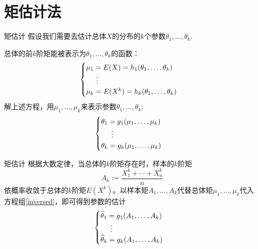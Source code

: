 
\section{矩估计法}


\begin{frame}

\begin{block}{矩估计}
假设我们需要去估计总体$X$的分布的$k$个参数$\theta_1, \ldots, \theta_k$.

\vspace{1em}

总体的前$k$阶矩能被表示为$\theta_1, \ldots, \theta_k$的函数：
\begin{equation*}
\begin{cases}
\mu_1 = E(X) = h_1(\theta_1, \ldots, \theta_k) \\
\hspace{0.5cm} \vdots \\
\mu_k = E(X^k) = h_k(\theta_1, \ldots, \theta_k)
\end{cases}
\end{equation*}
解上述方程，用$\mu_1,\ldots,\mu_k$来表示参数$\theta_1, \ldots, \theta_k$:
\begin{equation}
\label{inversed}
\begin{cases}
\theta_1 = g_1(\mu_1, \ldots, \mu_k) \\
\hspace{0.5cm} \vdots \\
\theta_k = g_k(\mu_1, \ldots, \mu_k)
\end{cases}
\end{equation}
\end{block}

\end{frame}


\begin{frame}

\begin{block}{矩估计}
根据大数定律，当总体的$k$阶矩存在时，样本的$k$阶矩
$$A_k := \dfrac{X_1^k+\cdots+X_n^k}{n}$$
依概率收敛于总体的$k$阶矩$E(X^k)$。以样本矩$A_1,\ldots,A_k$代替总体矩$\mu_1,\ldots,\mu_k$代入方程组\eqref{inversed}，即可得到参数的估计
\begin{equation*}
\begin{cases}
\widehat{\theta}_1 = g_1(A_1, \ldots, A_k) \\
\hspace{0.5cm} \vdots \\
\widehat{\theta}_k = g_k(A_1, \ldots, A_k)
\end{cases}
\end{equation*}
\end{block}

\end{frame}

